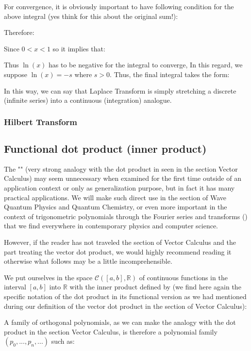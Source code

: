 For convergence, it is obviously important to have following condition for the above integral (yes think for this about the original sum!):
	 
	Therefore:
	 
	Since $0<x<1 $ so it implies that:
	
	Thus $\ln(x)$ has to be negative for the integral to converge, In this regard, we suppose $\ln(x)=-s$ where $s>0$. Thus, the final integral takes the form:
	
	In this way, we can say that Laplace Transform is simply  stretching a discrete (infinite series)  into a continuous (integration) analogue. 
	\subsubsection{Hilbert Transform}
	
	
	\subsection{Functional dot product (inner product)}
	The "" (very strong analogy with the dot product in seen in the section Vector Calculus) may seem unnecessary when examined for the first time outside of an application context or only as generalization purpose, but in fact it has many practical applications. We will make such direct use in the section of Wave Quantum Physics and Quantum Chemistry, or even more important in the context of trigonometric polynomials through the Fourier series and transforms () that we find everywhere in contemporary physics and computer science.
	
	However, if the reader has not traveled the section of Vector Calculus and the part treating the vector dot product, we would highly recommend reading it otherwise what follows may be a little incomprehensible.
	
	We put ourselves in the space $\mathcal{C}([a,b],\mathbb{R})$ of continuous functions in the interval $[a, b]$ into $\mathbb{R}$ with the inner product defined by (we find here again the specific notation of the dot product in its functional version as we had mentioned during our definition of the vector dot product in the section of Vector Calculus):
	
	A family of orthogonal polynomials, as we can make the analogy with the dot product in the section Vector Calculus, is therefore a polynomial family $(p_0,...,p_n,...)$ such as:
	
